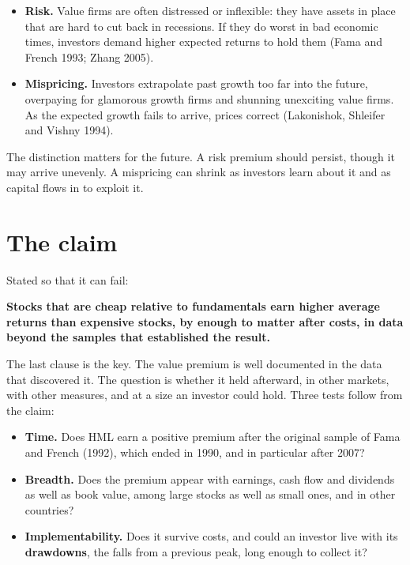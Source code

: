 \begin{itemize}
  \item \textbf{Risk.} Value firms are often distressed or inflexible: they have assets in place that are hard to cut back in recessions. If they do worst in bad economic times, investors demand higher expected returns to hold them (Fama and French 1993; Zhang 2005).
  \item \textbf{Mispricing.} Investors extrapolate past growth too far into the future, overpaying for glamorous growth firms and shunning unexciting value firms. As the expected growth fails to arrive, prices correct (Lakonishok, Shleifer and Vishny 1994).
\end{itemize}

The distinction matters for the future. A risk premium should persist, though it may arrive unevenly. A mispricing can shrink as investors learn about it and as capital flows in to exploit it.

\section{The claim}
\label{sec:08-claim}

Stated so that it can fail:

\begin{callout}
\textbf{Stocks that are cheap relative to fundamentals earn higher average returns than expensive stocks, by enough to matter after costs, in data beyond the samples that established the result.}
\end{callout}

The last clause is the key. The value premium is well documented in the data that discovered it. The question is whether it held afterward, in other markets, with other measures, and at a size an investor could hold. Three tests follow from the claim:

\begin{itemize}
  \item \textbf{Time.} Does HML earn a positive premium after the original sample of Fama and French (1992), which ended in 1990, and in particular after 2007?
  \item \textbf{Breadth.} Does the premium appear with earnings, cash flow and dividends as well as book value, among large stocks as well as small ones, and in other countries?
  \item \textbf{Implementability.} Does it survive costs, and could an investor live with its \textbf{drawdowns}, the falls from a previous peak, long enough to collect it?
\end{itemize}

